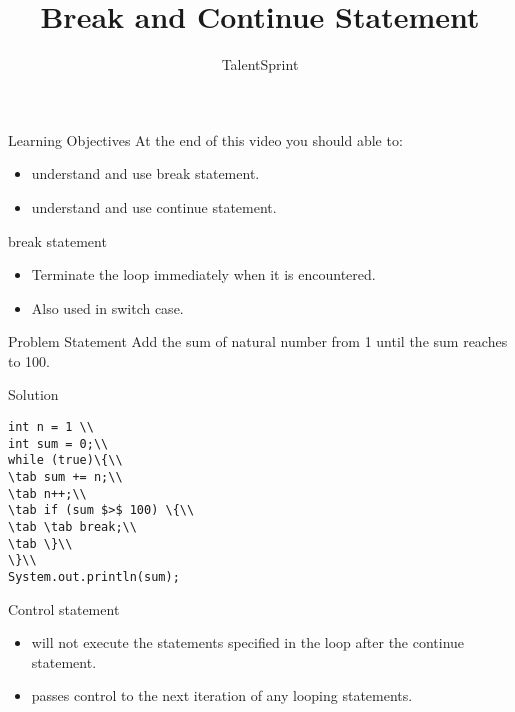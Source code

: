 \documentclass[aspectratio=169,14pt,usenames,dvipsnames]{beamer}
\title[Break and Continue Statement]{Break and Continue Statement}
\newcommand\tab[1][1cm]{\hspace*{#1}}
\begin{document}
{\1
\begin{frame} \vspace{35pt}

\subtitle{TalentSprint}
\maketitle
\end{frame}
}


\begin{frame}{Learning Objectives}
At the end of this video you should able to:
\begin{itemize}
\item understand and use break statement.
\item understand and use continue statement.
\end{itemize}
\end{frame}


\begin{frame}{break statement}
\begin{itemize}
    \item Terminate the loop immediately when it is
encountered.
    \item Also used in switch case.
\end{itemize}
\end{frame}



\begin{frame}{Problem Statement}
Add the sum of natural number from 1 until
the sum reaches to 100.
\end{frame}



\begin{frame}{Solution}
\begin{lstlisting}
int n = 1 \\
int sum = 0;\\
while (true)\{\\
\tab sum += n;\\
\tab n++;\\
\tab if (sum $>$ 100) \{\\
\tab \tab break;\\
\tab \}\\
\}\\
System.out.println(sum);
\end{lstlisting}
\end{frame}

\begin{frame}{Control statement}
\begin{itemize}
    \item will not execute the statements specified in
the loop after the continue statement.
    \item passes control to the next iteration of any
looping statements.
\end{itemize}
\end{frame}
\end{document}
